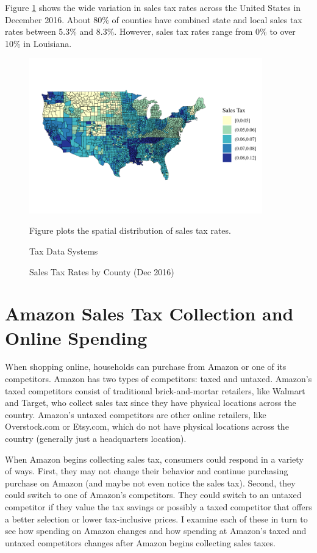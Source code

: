 \documentclass[AEJ,reviewmode]{AEA}
\begin{document}
Figure \ref{fig:taxStats} shows the wide variation in sales tax rates across the United States in December 2016. About 80\% of counties have combined state and local sales tax rates between 5.3\% and 8.3\%. However, sales tax rates range from 0\% to over 10\% in Louisiana.

\begin{figure}
\includegraphics[width = 0.9\textwidth]{../5_figures/taxRateByCounty.pdf}
\caption{Sales Tax Rates by County (Dec 2016)}
\begin{figurenotes}
Figure plots the spatial distribution of sales tax rates.
\end{figurenotes}
\begin{figurenotes}[Source]
Tax Data Systems
\end{figurenotes}
\label{fig:taxStats}
\end{figure}

\section{Amazon Sales Tax Collection and Online Spending}
\label{sec:model}

When shopping online, households can purchase from Amazon or one of its competitors. Amazon has two types of competitors: taxed and untaxed. Amazon's taxed competitors consist of traditional brick-and-mortar retailers, like Walmart and Target, who collect sales tax since they have physical locations across the country. Amazon's untaxed competitors are other online retailers, like Overstock.com or Etsy.com, which do not have physical locations across the country (generally just a headquarters location).

When Amazon begins collecting sales tax, consumers could respond in a variety of ways. First, they may not change their behavior and continue purchasing purchase on Amazon (and maybe not even notice the sales tax). Second, they could switch to one of Amazon's competitors. They could switch to an untaxed competitor if they value the tax savings or possibly a taxed competitor that offers a better selection or lower tax-inclusive prices. I examine each of these in turn to see how spending on Amazon changes and how spending at Amazon's taxed and untaxed competitors changes after Amazon begins collecting sales taxes.
\end{document}
